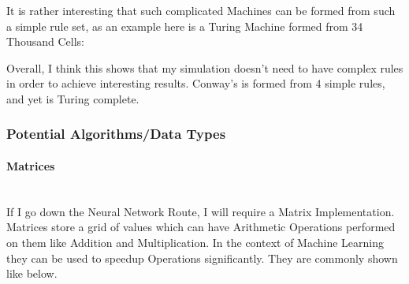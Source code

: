 \begin{flushleft}
                    \vspace{0.2cm}
                    It is rather interesting that such complicated Machines can be formed from such a simple rule set, as an example 
                    here is a Turing Machine formed from 34 Thousand Cells: \\

                    \begin{figure}[h]
                        \centering
                    \end{figure}

                    Overall, I think this shows that my simulation doesn't need to have complex rules in order to achieve 
                    interesting results. Conway's is formed from 4 simple rules, and yet is Turing complete.
            \subsubsection{Potential Algorithms/Data Types}
                \large
                \paragraph{Matrices} \mbox{} \\
                    If I go down the Neural Network Route, I will require a Matrix Implementation. Matrices store a grid of 
                    values which can have Arithmetic Operations performed on them like Addition and Multiplication. In the 
                    context of Machine Learning they can be used to speedup Operations significantly. They are commonly shown
                    like below. \\


\end{flushleft}
